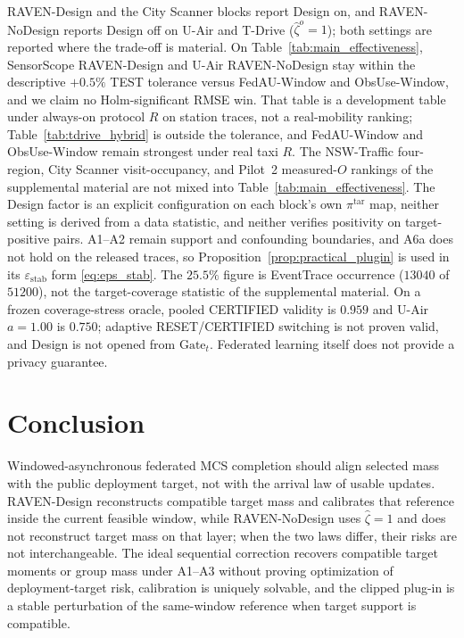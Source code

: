 \documentclass[letterpaper,journal]{IEEEtran}
\begin{document}
RAVEN-Design and the City Scanner blocks report Design on, and RAVEN-NoDesign
reports Design off on U-Air and T-Drive ($\widehat\zeta^{o}=1$); both settings are
reported where the trade-off is material.  On
Table~\ref{tab:main_effectiveness}, SensorScope RAVEN-Design and U-Air
RAVEN-NoDesign stay within the descriptive $+0.5\%$ TEST tolerance versus
FedAU-Window and ObsUse-Window, and we claim no Holm-significant RMSE win.  That
table is a development table under always-on protocol $R$ on station traces, not
a real-mobility ranking; Table~\ref{tab:tdrive_hybrid} is outside the tolerance,
and FedAU-Window and ObsUse-Window remain strongest under real taxi $R$.  The
NSW-Traffic four-region, City Scanner visit-occupancy, and Pilot~2 measured-$O$
rankings of the supplemental material are not mixed into
Table~\ref{tab:main_effectiveness}.  The Design factor is an explicit
configuration on each block's own $\pi^{\mathrm{tar}}$ map, neither setting is
derived from a data statistic, and neither verifies positivity on
target-positive pairs.  A1--A2 remain support and confounding boundaries, and
A6a does not hold on the released traces, so
Proposition~\ref{prop:practical_plugin} is used in its
$\varepsilon_{\mathrm{stab}}$ form \eqref{eq:eps_stab}.  The $25.5\%$ figure is
EventTrace occurrence ($13040$ of $51200$), not the target-coverage statistic of
the supplemental material.  On a frozen coverage-stress oracle, pooled CERTIFIED
validity is $0.959$ and U-Air $a=1.00$ is $0.750$; adaptive RESET/CERTIFIED
switching is not proven valid, and Design is not opened from
$\mathrm{Gate}_t$.  Federated learning itself does not provide a privacy
guarantee.


\section{Conclusion}
\label{sec:conclusion}

Windowed-asynchronous federated MCS completion should align selected mass
with the public deployment target, not with the arrival law of usable
updates.  RAVEN-Design reconstructs compatible target mass and calibrates that
reference inside the current feasible window, while RAVEN-NoDesign uses
$\widehat\zeta=1$ and does not reconstruct target mass on that layer; when the
two laws differ, their risks are not interchangeable.  The ideal sequential
correction recovers compatible target moments or group mass under A1--A3 without
proving optimization of deployment-target risk, calibration is uniquely solvable,
and the clipped plug-in is a stable perturbation of the same-window reference
when target support is compatible.
\end{document}
